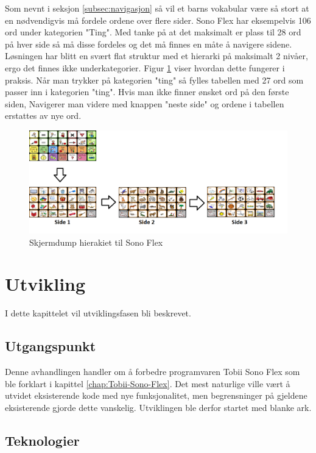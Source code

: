 \documentclass[phd,tocprelim]{cornell}
\begin{document}
Som nevnt i seksjon \ref{subsec:navigasjon} så vil et barns vokabular være så stort at en nødvendigvis må fordele ordene over flere sider. Sono Flex har eksempelvis 106 ord under kategorien "Ting". Med tanke på at det maksimalt er plass til 28 ord på hver side så må disse fordeles og det må finnes en måte å navigere sidene. Løsningen har blitt en svært flat struktur med et hierarki på maksimalt 2 nivåer, ergo det finnes ikke underkategorier. Figur \ref{fig:hieraki-ting} viser hvordan dette fungerer i praksis. Når man trykker på kategorien "ting" så fylles tabellen med 27 ord som passer inn i kategorien "ting". Hvis man ikke finner ønsket ord på den første siden, Navigerer man videre med knappen "neste side" og ordene i tabellen erstattes av nye ord. 


\begin{figure}[ht!]
\centering
\includegraphics[width=140mm]{Symbgrid}
\caption{Skjermdump hierakiet til Sono Flex}
\label{fig:hieraki-ting}
\end{figure}




\chapter{Utvikling}

I dette kapittelet vil utviklingsfasen bli beskrevet.  


\section{Utgangspunkt}

Denne avhandlingen handler om å forbedre programvaren Tobii Sono Flex som ble forklart i kapittel \ref{chap:Tobii-Sono-Flex}. 
Det mest naturlige ville vært å utvidet eksisterende kode med nye funksjonalitet,  men begrensninger på gjeldene eksisterende gjorde dette vanskelig. Utviklingen ble derfor startet med blanke ark. 


\section{Teknologier}
\end{document}
